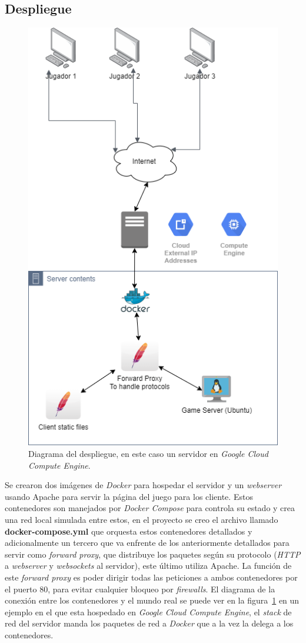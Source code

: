 \subsection{Despliegue}
\begin{figure}[H]
    \centering
    \includegraphics[width=0.5\linewidth]{images/diagrama_deployment.png}
    \caption{Diagrama del despliegue, en este caso un servidor en \textit{Google Cloud Compute Engine}.}
    \label{fig:diagrama_despliege}
\end{figure}
Se crearon dos imágenes de \textit{Docker} para hospedar el servidor y un \textit{webserver} usando Apache para servir la página del juego para los cliente. Estos contenedores son manejados por \textit{Docker Compose} para controla su estado y crea una red local simulada entre estos, en el proyecto se creo el archivo llamado \textbf{docker-compose.yml} que orquesta estos contenedores detallados y adicionalmente un tercero que va enfrente de los anteriormente detallados para servir como \textit{forward proxy}, que distribuye los paquetes según su protocolo (\textit{HTTP} a \textit{webserver} y \textit{websockets} al servidor), este último utiliza Apache. La función de este \textit{forward proxy} es poder dirigir todas las peticiones a ambos contenedores por el puerto 80, para evitar cualquier bloqueo por \textit{firewalls}. El diagrama de la conexión entre los contenedores y el mundo real se puede ver en la figura~\ref{fig:diagrama_despliege} en un ejemplo en el que esta hospedado en \textit{Google Cloud Compute Engine}, el \textit{stack} de red del servidor manda los paquetes de red a \textit{Docker} que a la vez la delega a los contenedores.
